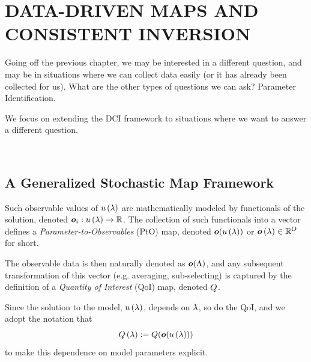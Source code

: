 \chapter{\uppercase{Data-Driven Maps and Consistent Inversion} \label{chapter:04}}

Going off the previous chapter, we may be interested in a different question, and may be in situations where we can collect data easily (or it has already been collected for us).
What are the other types of questions we can ask? Parameter Identification.

We focus on extending the DCI framework to situations where we want to answer a different question.

\
\section{A Generalized Stochastic Map Framework}
Such observable values of $u\left ( \lambda \right )$ are mathematically modeled by functionals of the solution, denoted $\operatorname*{\boldsymbol{o}}_i: u\left ( \lambda \right ) \to \mathbb{R}$.
The collection of such functionals into a vector defines a {\em Parameter-to-Observables} (PtO) map, denoted $\operatorname*{\boldsymbol{o}}( u\left ( \lambda \right ) )$ or $\operatorname*{\boldsymbol{o}}\left ( \lambda \right )\in\mathbb{R}^O$ for short.

The observable data is then naturally denoted as $\operatorname*{\boldsymbol{o}}({\Lambda})$, and any subsequent transformation of this vector (e.g. averaging, sub-selecting) is captured by the definition of a {\em Quantity of Interest} (QoI) map, denoted $Q$.

Since the solution to the model, $u\left ( \lambda \right )$, depends on $\lambda$, so do the QoI, and we adopt the notation that $$Q\left ( \lambda \right ) := Q(\operatorname*{\boldsymbol{o}}(u\left ( \lambda \right )))$$ to make this dependence on model parameters explicit.

